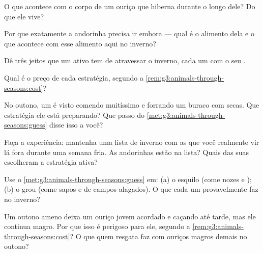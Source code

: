 \begin{exercise}[$\star$]\label{exo:g3:animals-through-seasons:3}
O que acontece com o corpo de um ouriço que hiberna durante o longo
 dele? Do que ele vive?
\end{exercise}

\begin{exercise}[$\star$]\label{exo:g3:animals-through-seasons:4}
Por que exatamente a andorinha precisa ir embora --- qual é o
alimento dela e o que acontece com esse alimento aqui no inverno?
\end{exercise}

\begin{exercise}[$\star$]\label{exo:g3:animals-through-seasons:5}
Dê três jeitos que um  ativo tem de atravessar o inverno, cada
um com o seu .
\end{exercise}

\begin{exercise}[$\star$]\label{exo:g3:animals-through-seasons:6}
Qual é o preço de cada estratégia, segundo a
\cref{rem:g3:animals-through-seasons:cost}?
\end{exercise}

\begin{exercise}[$\star$]\label{exo:g3:animals-through-seasons:7}
No outono, um  é visto comendo muitíssimo e forrando um buraco
com  secas. Que estratégia ele está preparando? Que passo do
\cref{met:g3:animals-through-seasons:guess} disse isso a você?
\end{exercise}

\begin{exercise}[$\star$]\label{exo:g3:animals-through-seasons:8}
Faça a experiência: mantenha uma lista de inverno com as  que
você realmente vir lá fora durante uma semana fria. As andorinhas
estão na lista? Quais das suas  escolheram a estratégia ativa?
\end{exercise}

\begin{exercise}[$\star\star$]\label{exo:g3:animals-through-seasons:9}
Use o \cref{met:g3:animals-through-seasons:guess} em: (a) o esquilo
(come nozes e ); (b) o grou (come sapos e  de campos
alagados). O que cada um provavelmente faz no inverno?
\end{exercise}

\begin{exercise}[$\star\star$]\label{exo:g3:animals-through-seasons:10}
Um outono ameno deixa um ouriço jovem acordado e caçando até tarde,
mas ele continua magro. Por que isso é perigoso para ele, segundo a
\cref{rem:g3:animals-through-seasons:cost}? O que quem resgata
 faz com ouriços magros demais no outono?
\end{exercise}
